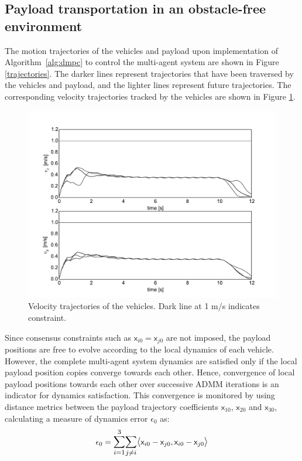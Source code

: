 \documentclass[letterpaper, 10 pt, conference]{ieeeconf}
\newcommand{\cx}{\textsf{x}}
\begin{document}
\subsection{Payload transportation in an obstacle-free environment}
The motion trajectories of the vehicles and payload upon implementation of Algorithm~\ref{alg:dmpc} to control the multi-agent system are shown in Figure \ref{trajectories}. The darker lines represent trajectories that have been traversed by the vehicles and payload, and the lighter lines represent future trajectories. The corresponding velocity trajectories tracked by the vehicles are shown in Figure \ref{velocities}.
\begin{figure}[H]
	\centering
	\includegraphics[scale=0.40]{figures/velocities_gray.pdf}
	\caption{Velocity trajectories of the vehicles. Dark line at 1 m/s indicates constraint.}
	\label{velocities}
\end{figure}
\indent
Since consensus constraints such as $\cx_{i0} = \cx_{j0}$ are not imposed, the payload positions are free to evolve according to the local dynamics of each vehicle. However, the complete multi-agent system dynamics are satisfied only if the local payload position copies converge towards each other. Hence, convergence of local payload positions towards each other over successive ADMM iterations is an indicator for dynamics satisfaction. This convergence is monitored by using distance metrics between the payload trajectory coefficients $\cx_{10}$, $\cx_{20}$ and $\cx_{30}$,  calculating a measure of dynamics error $\epsilon_0$ as:
\begin{equation}
\epsilon_0 = \mathlarger{\sum_{i=1}^{3}} \mathlarger{\sum_{j \neq i}} \mathlarger{\langle} \cx_{i0} - \cx_{j0},\cx_{i0} - \cx_{j0} \mathlarger{\rangle}
\end{equation}
\end{document}
